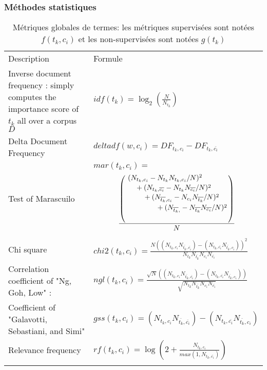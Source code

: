 \subsubsection{Méthodes statistiques}
\begin{table} 
	\caption{Métriques globales de termes: les métriques supervisées sont notées $f(t_k,c_i)$ et les non-supervisées sont notées $g(t_k)$} \label{tab:quanta:globalweights}
	\scriptsize
	\begin{tabular}{p{}@{\hskip 0.2in}p{}}
		\hline\noalign{\smallskip}
		Description & Formule \\
		\noalign{\smallskip}
		\hline
		\noalign{\smallskip}
		Inverse document frequency \cite{sparck1972idf}: simply computes the importance score of $t_k$ all over a corpus $D$ & $idf(t_k) = \log_2 (\frac{N}{N_{t_k}})$  \\ \noalign{\smallskip}
		Delta Document Frequency & $deltadf(w,c_i) = DF_{t_k,c_i} - DF_{t_k,\overline{c_i}}$\\ \noalign{\smallskip}
		Test of Marascuilo & $mar(t_k, c_i) = $ \begin{equation*} 
		\,
		\dfrac{\left(
			\splitdfrac{\splitdfrac{\splitdfrac{(N_{t_k,c_i} - N_{t_k}N_{t_k,c_i}/N)^2}{+ (N_{t_k,\overline{c_i}} - N_{t_k}N_{\overline{c_i}}/N)^2}}{+ (N_{\overline{t_k},c_i} - N_{c_i}N_{\overline{t_k}}/N)^2}}{+ (N_{\overline{t_k},\overline{}} - N_{\overline{t_k}}N_{\overline{c_i}}/N)^2}\right)}{N}
		\end{equation*} \\ \noalign{\smallskip}
		Chi square & $chi2(t_k,c_i) = \frac{N ((N_{t_k,c_i} N_{\overline{t_k},\overline{c_i}}) - (N_{t_k,\overline{c_i}} N_{\overline{t_k},c_i}))^2}{N_{t_k} N_{\overline{t_k}} N_{c_i} N_{\overline{c_i}}}$ \\ \noalign{\smallskip}
		Correlation coefficient of "Ng, Goh, Low" \cite{ng1997ngl} :   & $ngl(t_k,c_i) = \frac{\sqrt{N} ((N_{t_k,c_i} N_{\overline{t_k},\overline{c_i}}) - (N_{t_k,\overline{c_i}} N_{\overline{t_k},c_i}))}{\sqrt{N_{t_k} N_{\overline{t_k}} N_{c_i} N_{\overline{c_i}}}}$\\ \noalign{\smallskip}
		Coefficient of "Galavotti, Sebastiani, and Simi"  \cite{galavotti2000gss}& $gss(t_k,c_i) = (N_{t_k,c_i} N_{\overline{t_k},\overline{c_i}}) -  (N_{t_k,\overline{c_i}} N_{\overline{t_k},c_i})$ \\ \noalign{\smallskip}
		Relevance frequency & $rf(t_k, c_i) = \log\left(2 + \frac{N_{t_k, c_i}}{max(1, N_{t_k, \overline{c_i}})}\right)$\\ \noalign{\smallskip}

\end{tabular}
\end{table}
